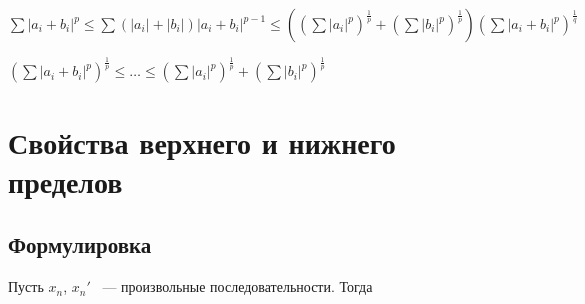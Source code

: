 \documentclass{article}
\begin{document}
            $\sum |a_i + b_i|^p \leq \sum ( |a_i| + |b_i| ) |a_i + b_i|^{p - 1} \leq \left( \left( \sum |a_i|^p \right)^{\frac{1}{p}} + \left( \sum |b_i|^p \right)^{\frac{1}{p}} \right) \left(\sum |a_i + b_i|^p \right)^{\frac{1}{q}}$
            
            $\left( \sum |a_i + b_i|^p \right)^{\frac{1}{p}} \leq \ldots \leq \left( \sum |a_i|^p \right)^{\frac{1}{p}} + \left( \sum |b_i|^p \right)^{\frac{1}{p}}$
            
    \newpage
    
    \section{Свойства верхнего и нижнего пределов}
    
        \subsection{Формулировка}
        
            Пусть $x_n$, $x_n'$ ~--- произвольные последовательности. Тогда
            
\end{document}
